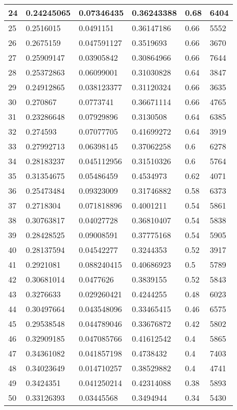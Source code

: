 \begin{longtable}{|l|l|l|l|l|l|}
24 & 0.24245065 & 0.07346435 & 0.36243388 & 0.68 & 6404 \\ \hline 
25 & 0.2516015 & 0.0491151 & 0.36147186 & 0.66 & 5552 \\ \hline 
26 & 0.2675159 & 0.047591127 & 0.3519693 & 0.66 & 3670 \\ \hline 
27 & 0.25909147 & 0.03905842 & 0.30864966 & 0.66 & 7644 \\ \hline 
28 & 0.25372863 & 0.06099001 & 0.31030828 & 0.64 & 3847 \\ \hline 
29 & 0.24912865 & 0.038123377 & 0.31120324 & 0.66 & 3635 \\ \hline 
30 & 0.270867 & 0.0773741 & 0.36671114 & 0.66 & 4765 \\ \hline 
31 & 0.23286648 & 0.07929896 & 0.3130508 & 0.64 & 6385 \\ \hline 
32 & 0.274593 & 0.07077705 & 0.41699272 & 0.64 & 3919 \\ \hline 
33 & 0.27992713 & 0.06398145 & 0.37062258 & 0.6 & 6278 \\ \hline 
34 & 0.28183237 & 0.045112956 & 0.31510326 & 0.6 & 5764 \\ \hline 
35 & 0.31354675 & 0.05486459 & 0.4534973 & 0.62 & 4071 \\ \hline 
36 & 0.25473484 & 0.09323009 & 0.31746882 & 0.58 & 6373 \\ \hline 
37 & 0.2718304 & 0.071818896 & 0.4001211 & 0.54 & 5861 \\ \hline 
38 & 0.30763817 & 0.04027728 & 0.36810407 & 0.54 & 5838 \\ \hline 
39 & 0.28428525 & 0.09008591 & 0.37775168 & 0.54 & 5905 \\ \hline 
40 & 0.28137594 & 0.04542277 & 0.3244353 & 0.52 & 3917 \\ \hline 
41 & 0.2921081 & 0.088240415 & 0.40686923 & 0.5 & 5789 \\ \hline 
42 & 0.30681014 & 0.0477626 & 0.3839155 & 0.52 & 5843 \\ \hline 
43 & 0.3276633 & 0.029260421 & 0.4244255 & 0.48 & 6023 \\ \hline 
44 & 0.30497664 & 0.043548096 & 0.33465415 & 0.46 & 6575 \\ \hline 
45 & 0.29538548 & 0.044789046 & 0.33676872 & 0.42 & 5802 \\ \hline 
46 & 0.32909185 & 0.047085766 & 0.41612542 & 0.4 & 5865 \\ \hline 
47 & 0.34361082 & 0.041857198 & 0.4738432 & 0.4 & 7403 \\ \hline 
48 & 0.34023649 & 0.014710257 & 0.38529882 & 0.4 & 4741 \\ \hline 
49 & 0.3424351 & 0.041250214 & 0.42314088 & 0.38 & 5893 \\ \hline 
50 & 0.33126393 & 0.03445568 & 0.3494944 & 0.34 & 5430 \\ \hline 
\end{longtable}